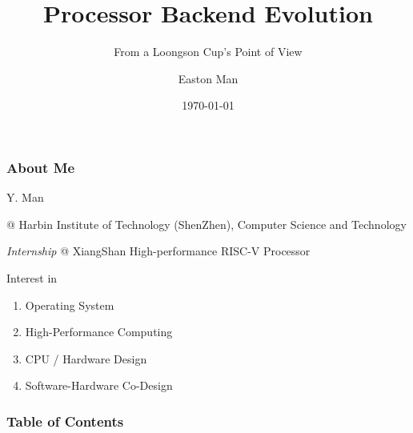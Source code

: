 \documentclass[aspectratio=169]{beamer}
\title{Processor Backend Evolution}
\subtitle{From a Loongson Cup's Point of View}
\author{Easton Man}
\institute[HITSZ]{Harbin Institute of Technology (ShenZhen)}
\date{\today}
\begin{document}
\frame{\titlepage}

\begin{frame}
    \frametitle{About Me}

    Y. Man

    @ Harbin Institute of Technology (ShenZhen), Computer Science and Technology

    \emph{Internship} @ XiangShan High-performance RISC-V Processor

    \vspace{2em}

    Interest in
    \begin{enumerate}
        \item Operating System
        \item High-Performance Computing
        \item CPU / Hardware Design
        \item Software-Hardware Co-Design
    \end{enumerate}

\end{frame}

\begin{frame}
    \frametitle{Table of Contents}
    \tableofcontents
\end{frame}






\end{document}
